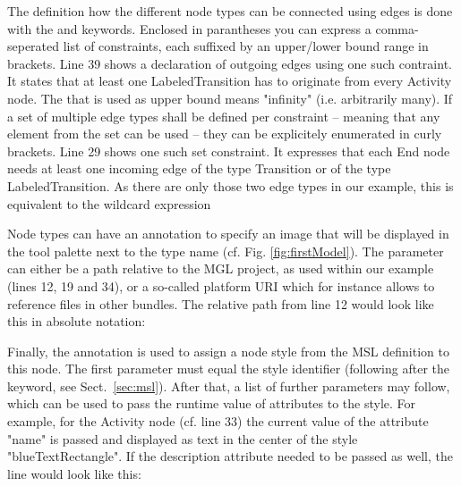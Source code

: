 \documentclass[a4paper,american,12pt]{scrreprt}
\begin{document}
The definition how the different node types can be connected using edges is
done with the  and  keywords\footnotemark{}.
%
%
Enclosed in parantheses you can express a comma-seperated list of constraints,
each suffixed by an upper/lower bound range in brackets. Line 39 shows a 
declaration of outgoing edges using one such contraint. It states that at least
one LabeledTransition has to originate from every Activity node. The \code{*}
that is used as upper bound means "infinity" (i.e. arbitrarily many). If a set
of multiple edge types shall be defined per constraint -- meaning that any
element from the set can be used -- they can be explicitely enumerated
in curly brackets. Line 29 shows one such set constraint. It expresses that each
End node needs at least one incoming edge of the type Transition or of the type
LabeledTransition. As there are only those two edge types in our example, this
is equivalent to the wildcard expression \code{(*[1 ,*])}

Node types can have an  annotation to specify an image that will be
displayed in the tool palette next to the type name (cf. Fig.
\ref{fig:firstModel}). The parameter can either be a path relative to the MGL
project, as used within our example (lines 12, 19 and 34), or a so-called
platform URI which for instance allows to reference files in other bundles. The
relative path from line 12 would look like this in absolute notation:


\FloatBarrier

Finally, the  annotation is used to assign a node style from the
MSL definition to this node. The first parameter must equal the style identifier
(following after the  keyword, see Sect.~\ref{sec:msl}). After
that, a list of further parameters may follow, which can be used to pass the
runtime value of attributes to the style. For example, for the Activity node
(cf. line 33) the current value of the attribute "name" is passed and displayed
as text in the center of the style "blueTextRectangle". If the description
attribute needed to be passed as well, the line would look like this:

\end{document}

